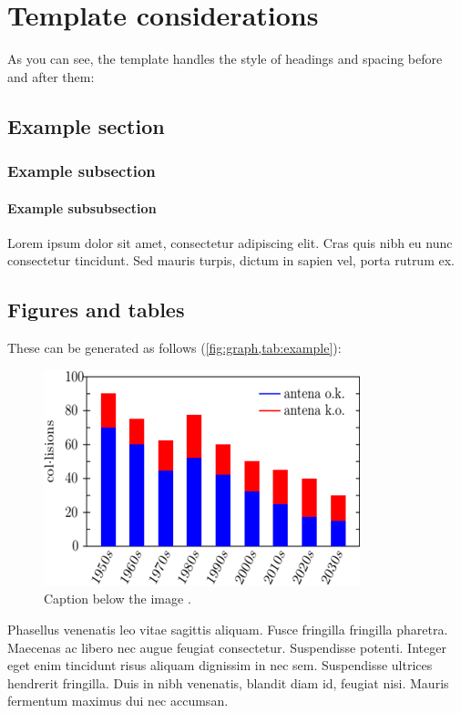 \chapter{Template considerations}

As you can see, the template handles the style of headings and spacing before and after them:

\section{Example section}
\subsection{Example subsection}
\subsubsection{Example subsubsection}
Lorem ipsum dolor sit amet, consectetur adipiscing elit. Cras quis nibh eu nunc consectetur tincidunt. Sed mauris turpis, dictum in sapien vel, porta rutrum ex.

\section{Figures and tables}

These can be generated as follows (\cref{fig:graph,tab:example}):

\begin{figure}[hbtp!]
    \centering
    \includegraphics[width=0.5\linewidth]{img/example.png}
    \caption[Shorter name for list of tables or to escape the citation]{Caption below the image \cite{dawson}.}
    \label{fig:graph}
\end{figure}

Phasellus venenatis leo vitae sagittis aliquam. Fusce fringilla fringilla pharetra. Maecenas ac libero nec augue feugiat consectetur. Suspendisse potenti. Integer eget enim tincidunt risus aliquam dignissim in nec sem. Suspendisse ultrices hendrerit fringilla. Duis in nibh venenatis, blandit diam id, feugiat nisi. Mauris fermentum maximus dui nec accumsan. 

